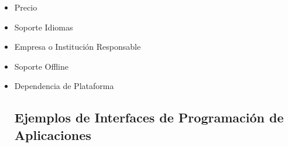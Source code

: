 \begin{itemize}
	\item Precio
	\item Soporte Idiomas
	\item Empresa o Instituci\'on Responsable
	\item Soporte Offline
	\item Dependencia de Plataforma

\subsection{Ejemplos de Interfaces de Programaci\'on de Aplicaciones}

\end{itemize}





